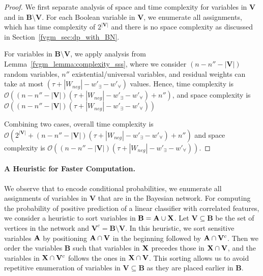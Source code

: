 \begin{proof}
	We first separate analysis of space and time complexity for variables in $ \mathbf{V} $ and in $\mathbf{B}\setminus \mathbf{V} $. For each Boolean variable in $ \mathbf{V} $, we enumerate all assignments, which has time complexity of $ 2^{|\mathbf{V}|} $ and there is no space complexity as discussed in Section~\ref{fvgm_sec:dp_with_BN}. 
	
	
	For variables in $\mathbf{B}\setminus \mathbf{V} $, we apply analysis from  Lemma~\ref{fvgm_lemma:complexity_sss}, where we consider $ (n - n'' - |\mathbf{V}|) $ random variables, $ n'' $ existential/universal variables, and residual weights can take at most $ (\tau + |W_{neg}| - w'_{\exists} - w'_{\forall}) $ values. Hence, time complexity is $ \mathcal{O}((n - n'' - |\mathbf{V}|)(\tau + |W_{neg}| - w'_{\exists} - w'_{\forall}) + n'') $, and space complexity is $ \mathcal{O}((n - n'' - |\mathbf{V}|)(\tau + |W_{neg}| - w'_{\exists} - w'_{\forall})) $ 
	
	Combining two cases, overall time complexity is $ \mathcal{O}(2^{|\mathbf{V}|} + (n - n'' - |\mathbf{V}|)(\tau + |W_{neg}| - w'_{\exists} - w'_{\forall}) + n'') $ and space complexity is $ \mathcal{O}((n - n'' - |\mathbf{V}|)(\tau + |W_{neg}| - w'_{\exists} - w'_{\forall})) $. 
\end{proof}

\paragraph{A Heuristic for Faster Computation.} We observe that to encode conditional probabilities, we enumerate all assignments of variables in $ \mathbf{V} $ that are in the Bayesian network. For computing the probability of positive prediction of a linear classifier with correlated features, we consider a heuristic to sort variables in $ \mathbf{B} = \mathbf{A} \cup \mathbf{X} $. Let $ \mathbf{V} \subseteq \mathbf{B} $ be the set of vertices in the network and $ \mathbf{V}^c = \mathbf{B} \setminus \mathbf{V} $. In this heuristic, we sort sensitive variables $ \mathbf{A} $ by positioning $ \mathbf{A} \cap \mathbf{V} $ in the beginning followed by $ \mathbf{A} \cap \mathbf{V}^c $. Then we order the variables $ \mathbf{B} $ such that variables in $ \mathbf{X} $ precedes those in $ \mathbf{X} \cap \mathbf{V} $, and the variables in $ \mathbf{X} \cap \mathbf{V}^c $ follows the ones in $ \mathbf{X} \cap \mathbf{V} $. This sorting allows us to avoid repetitive enumeration of variables in $ \mathbf{V} \subseteq \mathbf{B} $ as they are placed earlier in $ \mathbf{B} $.

